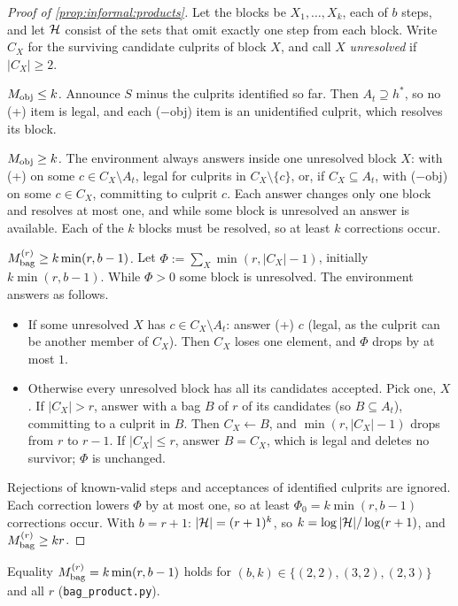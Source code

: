 \begin{proof}[Proof of \cref{prop:informal:products}]
Let the blocks be $X_1,\dots,X_k$, each of $b$ steps, and let $\mathcal{H}$ consist of the sets that omit exactly one step from each block. Write $C_X$ for the surviving candidate culprits of block $X$, and call $X$ \emph{unresolved} if $|C_X|\ge2$.

\emph{$M_{\mathrm{obj}}\le k$.} Announce $S$ minus the culprits identified so far. Then $A_t\supseteq h^*$, so no (+) item is legal, and each (\(-\)obj) item is an unidentified culprit, which resolves its block.

\emph{$M_{\mathrm{obj}}\ge k$.} The environment always answers inside one unresolved block $X$: with (+) on some $c\in C_X\setminus A_t$, legal for culprits in $C_X\setminus\{c\}$, or, if $C_X\subseteq A_t$, with (\(-\)obj) on some $c\in C_X$, committing to culprit $c$. Each answer changes only one block and resolves at most one, and while some block is unresolved an answer is available. Each of the $k$ blocks must be resolved, so at least $k$ corrections occur.

\emph{$M^{(r)}_{\mathrm{bag}}\ge k\min(r,b-1)$.} Let $\Phi:=\sum_X\min(r,|C_X|-1)$, initially $k\min(r,b-1)$. While $\Phi>0$ some block is unresolved. The environment answers as follows.
\begin{itemize}
\item If some unresolved $X$ has $c\in C_X\setminus A_t$: answer (+) $c$ (legal, as the culprit can be another member of $C_X$). Then $C_X$ loses one element, and $\Phi$ drops by at most $1$.
\item Otherwise every unresolved block has all its candidates accepted. Pick one, $X$. If $|C_X|>r$, answer with a bag $B$ of $r$ of its candidates (so $B\subseteq A_t$), committing to a culprit in $B$. Then $C_X\leftarrow B$, and $\min(r,|C_X|-1)$ drops from $r$ to $r-1$. If $|C_X|\le r$, answer $B=C_X$, which is legal and deletes no survivor; $\Phi$ is unchanged.
\end{itemize}
Rejections of known-valid steps and acceptances of identified culprits are ignored. Each correction lowers $\Phi$ by at most one, so at least $\Phi_0=k\min(r,b-1)$ corrections occur. With $b=r+1$: $|\mathcal{H}|=(r+1)^k$, so $k=\log|\mathcal{H}|/\log(r+1)$, and $M^{(r)}_{\mathrm{bag}}\ge kr$.
\end{proof}

Equality $M^{(r)}_{\mathrm{bag}}=k\min(r,b-1)$ holds for $(b,k)\in\{(2,2),(3,2),(2,3)\}$ and all $r$  (\texttt{bag\_product.py}).

